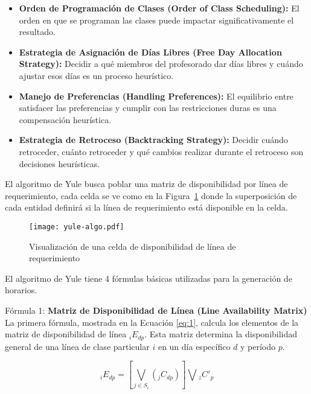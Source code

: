 \begin{itemize}
    \item \textbf{Orden de Programación de Clases (Order of Class Scheduling):} El orden en que se programan las clases puede impactar significativamente el resultado.
    \item \textbf{Estrategia de Asignación de Días Libres (Free Day Allocation Strategy):} Decidir a qué miembros del profesorado dar días libres y cuándo ajustar esos días es un proceso heurístico.
    \item \textbf{Manejo de Preferencias (Handling Preferences):} El equilibrio entre satisfacer las preferencias y cumplir con las restricciones duras es una compensación heurística.
    \item \textbf{Estrategia de Retroceso (Backtracking Strategy):} Decidir cuándo retroceder, cuánto retroceder y qué cambios realizar durante el retroceso son decisiones heurísticas.
\end{itemize}

El algoritmo de Yule busca poblar una matriz de disponibilidad por línea de requerimiento, cada celda se ve como en la Figura~\ref{fig:yuleAlgorithm} donde la superposición de cada entidad definirá si la línea de requerimiento está disponible en la celda.
\begin{figure}[H]
    \centering
    \caption{Visualización de una celda de disponibilidad de línea de requerimiento}
    \texttt{[image: yule-algo.pdf]}
    \label{fig:yuleAlgorithm}
\end{figure}

El algoritmo de Yule tiene 4 fórmulas básicas utilizadas para la generación de horarios.

Fórmula 1: \textbf{Matriz de Disponibilidad de Línea (Line Availability Matrix)} La primera fórmula, mostrada en la Ecuación \ref{eq:1}, calcula los elementos de la matriz de disponibilidad de línea \( _iE_{dp} \).
Esta matriz determina la disponibilidad general de una línea de clase particular \( i \) en un día específico \( d \) y período \( p \).

\begin{equation}
\label{eq:1}
_iE_{dp} = \left[\bigvee_{j \in S_i} (_jC_{dp})\right] \bigvee {}_zC'_{p}
\end{equation}

